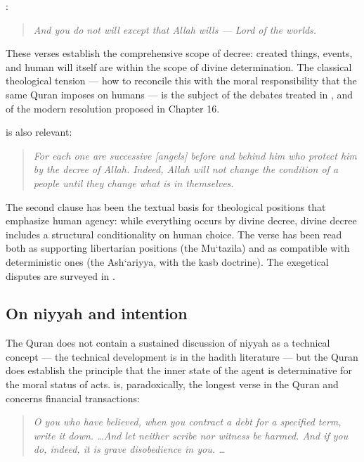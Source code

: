 :

\begin{quote}
\textit{And you do not will except that Allah wills --- Lord of the
worlds.}
\end{quote}

These verses establish the comprehensive scope of decree: created
things, events, and human will itself are within the scope of
divine determination. The classical theological tension --- how to
reconcile this with the moral responsibility that the same Quran
imposes on humans --- is the subject of the  debates
treated in , and of the modern resolution proposed
in Chapter 16.

 is also relevant:

\begin{quote}
\textit{For each one are successive [angels] before and behind him
who protect him by the decree of Allah. Indeed, Allah will not change
the condition of a people until they change what is in themselves.}
\end{quote}

The second clause has been the textual basis for theological
positions that emphasize human agency: while everything occurs by
divine decree, divine decree includes a structural conditionality on
human choice. The verse has been read both as supporting libertarian
positions (the Mu`tazila) and as compatible with deterministic ones
(the Ash`ariyya, with the kasb doctrine). The exegetical disputes
are surveyed in .

\subsection{On niyyah and intention}

The Quran does not contain a sustained discussion of niyyah as a
technical concept --- the technical development is in the hadith
literature --- but the Quran does establish the principle that the
inner state of the agent is determinative for the moral status of
acts.  is, paradoxically, the longest verse in the
Quran and concerns financial transactions:

\begin{quote}
\textit{O you who have believed, when you contract a debt for a
specified term, write it down. \dots And let neither scribe nor
witness be harmed. And if you do, indeed, it is grave disobedience
in you. \dots}
\end{quote}

